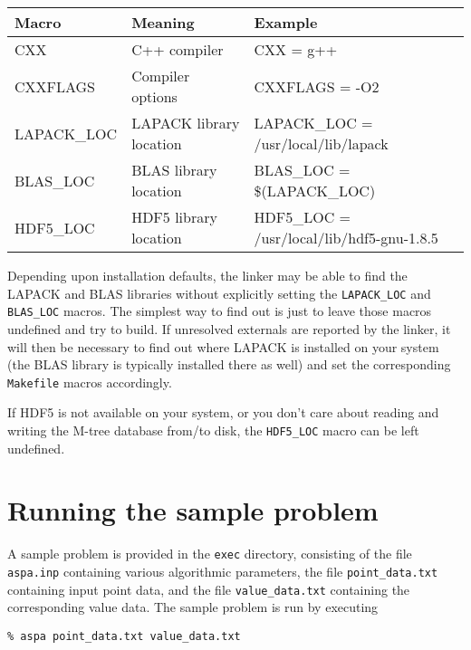 \documentclass[12pt]{article}
\begin{document}
\begin{table}[h]
\center
\begin{tabular}{|l|l|l|}
\hline
Macro & Meaning & Example \\
\hline
CXX & C++ compiler & CXX = g++ \\
CXXFLAGS & Compiler options&
CXXFLAGS = -O2 \\
LAPACK\_LOC & LAPACK library location & LAPACK\_LOC = /usr/local/lib/lapack \\
BLAS\_LOC & BLAS library location & BLAS\_LOC = \$(LAPACK\_LOC) \\
HDF5\_LOC & HDF5 library location & HDF5\_LOC =
/usr/local/lib/hdf5-gnu-1.8.5 \\
\hline
\end{tabular}
\end{table}

\noindent Depending upon installation defaults, the linker may be
able to find the LAPACK and BLAS libraries without explicitly setting
the {\tt LAPACK\_LOC} and {\tt BLAS\_LOC} macros.  The simplest way to
find out is just to leave those macros undefined and try to build.  If
unresolved externals are reported by the linker, it will then be necessary to find
out where LAPACK is installed on your system (the BLAS library is
typically installed there as well) and set the corresponding
{\tt Makefile} macros accordingly.

If HDF5 is not available on your system, or you don't care about
reading and writing the M-tree database from/to disk, 
the {\tt HDF5\_LOC} macro can be left undefined.

\section{Running the sample problem}

A sample problem is provided in the {\tt exec} directory, consisting
of the file {\tt aspa.inp} containing various algorithmic parameters,
the file {\tt point\_data.txt} containing input point data, and the file
{\tt value\_data.txt} containing the corresponding value data.  The
sample problem is run by executing

\vspace{1em}
{\tt \% aspa point\_data.txt value\_data.txt}
\vspace{1em}
\end{document}
